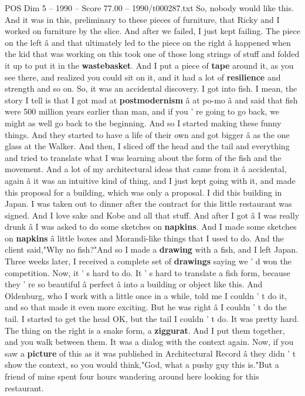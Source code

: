 \begin{textsample}{POS Dim 5 – 1990 – Score 77.00 – 1990/t000287.txt}
So, nobody would like this.
And it was in this, preliminary to these pieces of furniture, that Ricky and I worked on furniture by the slice.
And after we failed, I just kept failing.
The piece on the left â and that ultimately led to the piece on the right â happened when the kid that was working on this took one of those long strings of stuff and folded it up to put it in the \textbf{wastebasket}.
And I put a piece of \textbf{tape} around it, as you see there, and realized you could sit on it, and it had a lot of \textbf{resilience} and strength and so on.
So, it was an accidental discovery.
I got into fish.
I mean, the story I tell is that I got mad at \textbf{postmodernism} â at po-mo â and said that fish were 500 million years earlier than man, and if you ' re going to go back, we might as well go back to the beginning.
And so I started making these funny things.
And they started to have a life of their own and got bigger â as the one glass at the Walker.
And then, I sliced off the head and the tail and everything and tried to translate what I was learning about the form of the fish and the movement.
And a lot of my architectural ideas that came from it â accidental, again â it was an intuitive kind of thing, and I just kept going with it, and made this proposal for a building, which was only a proposal.
I did this building in Japan.
I was taken out to dinner after the contract for this little restaurant was signed.
And I love sake and Kobe and all that stuff.
And after I got â I was really drunk â I was asked to do some sketches on \textbf{napkins}.
And I made some sketches on \textbf{napkins} â little boxes and Morandi-like things that I used to do.
And the client said,"Why no fish?"And so I made a \textbf{drawing} with a fish, and I left Japan.
Three weeks later, I received a complete set of \textbf{drawings} saying we ' d won the competition.
Now, it ' s hard to do.
It ' s hard to translate a fish form, because they ' re so beautiful â perfect â into a building or object like this.
And Oldenburg, who I work with a little once in a while, told me I couldn ' t do it, and so that made it even more exciting.
But he was right â I couldn ' t do the tail.
I started to get the head OK, but the tail I couldn ' t do.
It was pretty hard.
The thing on the right is a snake form, a \textbf{ziggurat}.
And I put them together, and you walk between them.
It was a dialog with the context again.
Now, if you saw a \textbf{picture} of this as it was published in Architectural Record â they didn ' t show the context, so you would think,"God, what a pushy guy this is."But a friend of mine spent four hours wandering around here looking for this restaurant.

\end{textsample}

